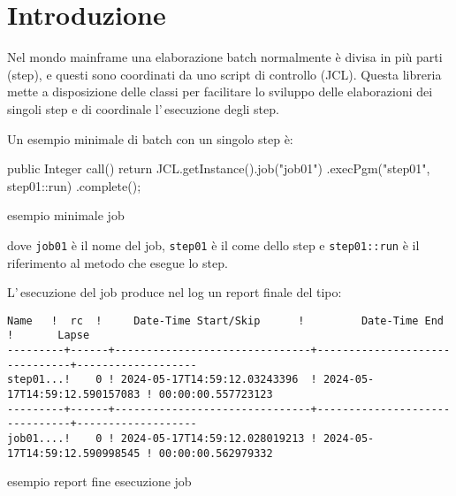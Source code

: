 \section*{Introduzione}
Nel mondo mainframe una elaborazione batch normalmente è divisa in più parti
(step), e questi sono coordinati da uno script di controllo (JCL).
Questa libreria mette a disposizione delle classi per facilitare lo sviluppo
delle elaborazioni dei singoli step e di coordinale l'\,esecuzione degli step.

Un esempio minimale di batch con un singolo step è:
\begin{elisting}[!htb]
    \begin{javacode}
        public Integer call() {
    return JCL.getInstance().job("job01")
        .execPgm("step01", step01::run)
        .complete();
}
    \end{javacode}
    \caption{esempio minimale job}
    \label{lst:demoJob}
\end{elisting}
dove \texttt{job01} è il nome del job, \texttt{step01} è il come dello step e
\texttt{step01::run} è il riferimento al metodo che esegue lo step.

L'\,esecuzione del job produce nel log un report finale del tipo:
\begin{elisting}[!htb]
    \begin{Verbatim}[fontsize=\small,frame=single]
   Name   !  rc  !     Date-Time Start/Skip      !         Date-Time End         !       Lapse
---------+------+-------------------------------+-------------------------------+-------------------
step01...!    0 ! 2024-05-17T14:59:12.03243396  ! 2024-05-17T14:59:12.590157083 ! 00:00:00.557723123
---------+------+-------------------------------+-------------------------------+-------------------
job01....!    0 ! 2024-05-17T14:59:12.028019213 ! 2024-05-17T14:59:12.590998545 ! 00:00:00.562979332
    \end{Verbatim}
    \caption{esempio report fine esecuzione job}
    \label{lst:demoLog}
\end{elisting}
